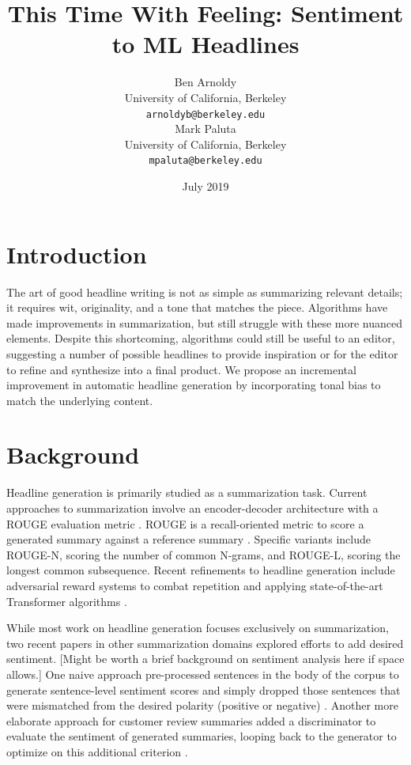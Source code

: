 \documentclass[11pt]{article}
\title{This Time With Feeling: Sentiment to ML Headlines}
\author{Ben Arnoldy \\
  University of California, Berkeley \\
  {\tt arnoldyb@berkeley.edu} \\\And
  Mark Paluta \\
  University of California, Berkeley \\
  {\tt mpaluta@berkeley.edu} \\}
\date{July 2019}
\begin{document}
\maketitle

\begin{abstract}
    
\end{abstract}

\section{Introduction}
The art of good headline writing is not as simple as summarizing relevant details; it requires wit, originality, and a tone that matches the piece. Algorithms have made improvements in summarization, but still struggle with these more nuanced elements. Despite this shortcoming, algorithms could still be useful to an editor, suggesting a number of possible headlines to provide inspiration or for the editor to refine and synthesize into a final product. We propose an incremental improvement in automatic headline generation by incorporating tonal bias to match the underlying content.

\section{Background}
Headline generation is primarily studied as a summarization task. Current approaches to summarization involve an encoder-decoder architecture \citep{rush2015neural} with a ROUGE evaluation metric \cite{Ayana2017}. ROUGE is a recall-oriented metric to score a generated summary against a reference summary \cite{lin-2004-rouge}. Specific variants include ROUGE-N, scoring the number of common N-grams, and ROUGE-L, scoring the longest common subsequence. Recent refinements to headline generation include adversarial reward systems to combat repetition \cite{DBLP:journals/corr/abs-1902-07110} and applying state-of-the-art Transformer algorithms \cite{DBLP:journals/corr/abs-1901-07786}.

While most work on headline generation focuses exclusively on summarization, two recent papers in other summarization domains explored efforts to add desired sentiment. [Might be worth a brief background on sentiment analysis here if space allows.] One naive approach pre-processed sentences in the body of the corpus to generate sentence-level sentiment scores and simply dropped those sentences that were mismatched from the desired polarity (positive or negative) \cite{DBLP:journals/corr/abs-1802-09426}. Another more elaborate approach for customer review summaries added a discriminator to evaluate the sentiment of generated summaries, looping back to the generator to optimize on this additional criterion \cite{DBLP:journals/corr/HuYLSX17}. 
\end{document}
